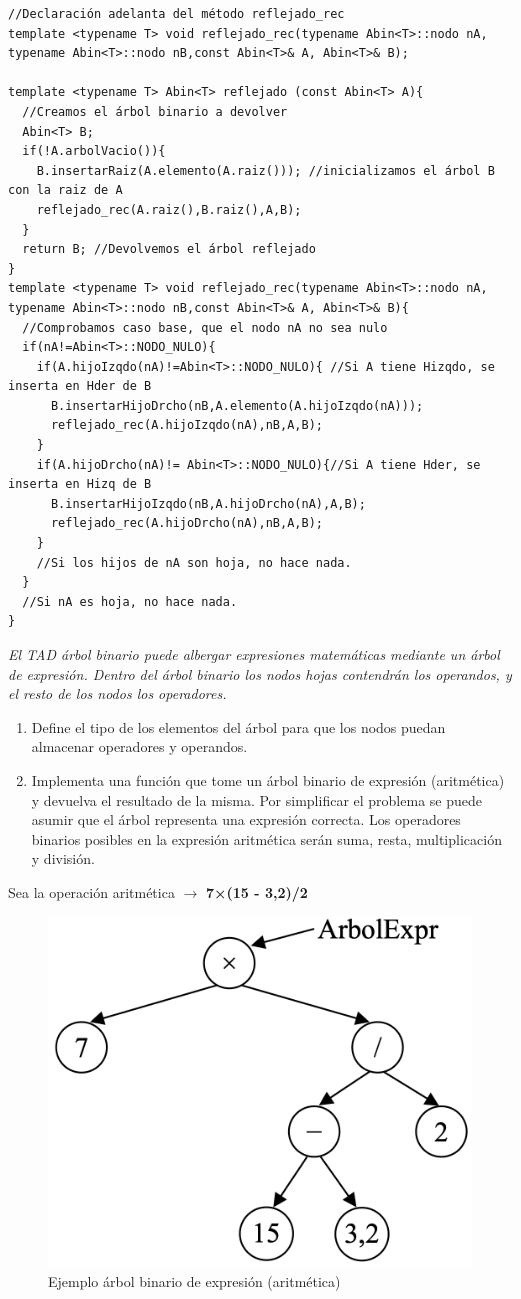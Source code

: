 \begin{verbatim}
//Declaración adelanta del método reflejado_rec
template <typename T> void reflejado_rec(typename Abin<T>::nodo nA, typename Abin<T>::nodo nB,const Abin<T>& A, Abin<T>& B);

template <typename T> Abin<T> reflejado (const Abin<T> A){
  //Creamos el árbol binario a devolver
  Abin<T> B;
  if(!A.arbolVacio()){
    B.insertarRaiz(A.elemento(A.raiz())); //inicializamos el árbol B con la raiz de A
    reflejado_rec(A.raiz(),B.raiz(),A,B);
  }
  return B; //Devolvemos el árbol reflejado
}
template <typename T> void reflejado_rec(typename Abin<T>::nodo nA, typename Abin<T>::nodo nB,const Abin<T>& A, Abin<T>& B){
  //Comprobamos caso base, que el nodo nA no sea nulo
  if(nA!=Abin<T>::NODO_NULO){
    if(A.hijoIzqdo(nA)!=Abin<T>::NODO_NULO){ //Si A tiene Hizqdo, se inserta en Hder de B
      B.insertarHijoDrcho(nB,A.elemento(A.hijoIzqdo(nA)));
      reflejado_rec(A.hijoIzqdo(nA),nB,A,B);
    }
    if(A.hijoDrcho(nA)!= Abin<T>::NODO_NULO){//Si A tiene Hder, se inserta en Hizq de B
      B.insertarHijoIzqdo(nB,A.hijoDrcho(nA),A,B);
      reflejado_rec(A.hijoDrcho(nA),nB,A,B);
    }
    //Si los hijos de nA son hoja, no hace nada.
  }
  //Si nA es hoja, no hace nada.
}
\end{verbatim}
\textbf{\large{}}\textit{ El TAD árbol binario puede albergar expresiones matemáticas mediante un árbol de expresión. Dentro del árbol binario los nodos hojas contendrán los operandos, y el resto de los nodos los operadores.}
\begin{enumerate}[label=\alph*)]
  \item Define el tipo de los elementos del árbol para que los nodos puedan almacenar
  operadores y operandos.
  \item Implementa una función que tome un árbol binario de expresión (aritmética) y
  devuelva el resultado de la misma. Por simplificar el problema se puede asumir que el
  árbol representa una expresión correcta. Los operadores binarios posibles en la expresión
  aritmética serán suma, resta, multiplicación y división.
\end{enumerate}
Sea la operación aritmética \(\rightarrow\) \textbf{7×(15 - 3,2)/2}
\begin{figure}[h]
  \begin{center}
    \includegraphics*[width=.3\textwidth]{assets/p2.1.png}
  \end{center}
  \caption{Ejemplo árbol binario de expresión (aritmética)}
\end{figure}

